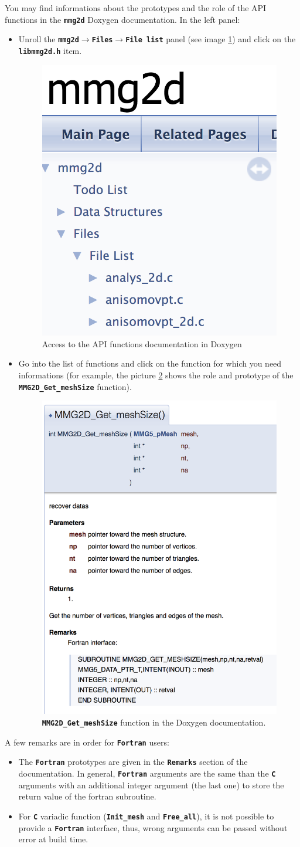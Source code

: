 \documentclass{article}
\newcommand{\ttb}[1]{\texttt{\textbf{#1}}}
\newcommand{\ra}{$\rightarrow$}
\begin{document}
You may find informations about the prototypes and the role of the API
functions in the \ttb{mmg2d} Doxygen
documentation. In the left panel:
\begin{itemize}
\item Unroll the \ttb{mmg2d}\ra\ttb{Files}\ra\ttb{File list} panel
  (see image \ref{dox-1}) and click on the \ttb{libmmg2d.h} item.
\begin{figure}
\centering
\includegraphics[width=0.3\linewidth]{Doxygen-1}
\caption{\label{dox-1}
Access to the API functions documentation in Doxygen}
\end{figure}
\item Go into the list of functions and click on the function for
  which you need informations (for example, the picture \ref{dox-2}
  shows the role and prototype of the \ttb{MMG2D\_Get\_meshSize}
    function).
\begin{figure}
\centering
\includegraphics[width=0.5\linewidth]{Doxygen-2}
\caption{\label{dox-2}
\ttb{MMG2D\_Get\_meshSize} function in the Doxygen documentation.}
\end{figure}
\end{itemize}

A few remarks are in order for \ttb{Fortran} users:
\begin{itemize}
\item The \ttb{Fortran} prototypes are given in the \ttb{Remarks} section of
  the documentation. In general, \ttb{Fortran} arguments are the same than the \ttb{C}
  arguments with an additional integer argument (the last one) to
  store the return value of the fortran subroutine.
\item For \ttb{C} variadic function (\ttb{Init\_mesh} and \ttb{Free\_all}),
  it is not possible to provide a \ttb{Fortran} interface, thus, wrong
  arguments can be passed without error at build time.
\end{itemize}
\end{document}
